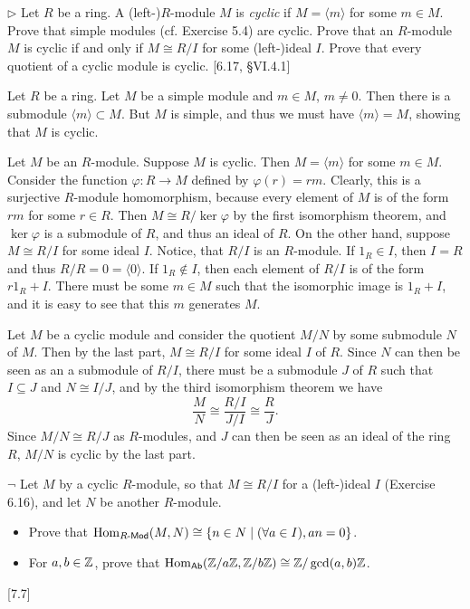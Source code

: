 \begin{problem}
	$\triangleright$ Let $R$ be a ring. A (left-)$R$-module $M$ is \emph{cyclic} if $M = \langle m \rangle$ for some $m \in M$. Prove that simple modules (cf. Exercise 5.4) are cyclic. Prove that an $R$-module $M$ is cyclic if and only if $M \cong R/I$ for some (left-)ideal $I$. Prove that every quotient of a cyclic module is cyclic. [6.17, \S VI.4.1]
\end{problem}

\begin{solution}
	Let $R$ be a ring. Let $M$ be a simple module and $m \in M$, $m \neq 0$. Then there is a submodule $\langle m \rangle \subset M$. But $M$ is simple, and thus we must have $\langle m \rangle = M$, showing that $M$ is cyclic.
	
	Let $M$ be an $R$-module. Suppose $M$ is cyclic. Then $M = \langle m \rangle$ for some $m \in M$. Consider the function $\varphi: R \to M$ defined by $\varphi(r) = rm$. Clearly, this is a surjective $R$-module homomorphism, because every element of $M$ is of the form $rm$ for some $r \in R$. Then $M \cong R/\ker \varphi$ by the first isomorphism theorem, and $\ker \varphi$ is a submodule of $R$, and thus an ideal of $R$. On the other hand, suppose $M \cong R/I$ for some ideal $I$. Notice, that $R/I$ is an $R$-module. If $1_R \in I$, then $I = R$ and thus $R/R = 0 = \langle 0 \rangle$. If $1_R \not \in I$, then each element of $R/I$ is of the form $r 1_R + I$. There must be some $m \in M$ such that the isomorphic image is $1_R + I$, and it is easy to see that this $m$ generates $M$.
	
	Let $M$ be a cyclic module and consider the quotient $M/N$ by some submodule $N$ of $M$. Then by the last part, $M \cong R/I$ for some ideal $I$ of $R$. Since $N$ can then be seen as an a submodule of $R/I$, there must be a submodule $J$ of $R$ such that $I \subseteq J$ and $N \cong I/J$, and by the third isomorphism theorem we have
	\[
		\frac{M}{N} \cong \frac{R/I}{J/I} \cong \frac{R}{J} \text{.}
	\]
	Since $M/N \cong R/J$ as $R$-modules, and $J$ can then be seen as an ideal of the ring $R$, $M/N$ is cyclic by the last part.
\end{solution}

\begin{problem}
	$\neg$ Let $M$ by a cyclic $R$-module, so that $M \cong R/I$ for a (left-)ideal $I$ (Exercise 6.16), and let $N$ be another $R$-module.
	\begin{itemize}
		\item Prove that $\mathrm{Hom}_{R\text{-}\mathsf{Mod}}(M, N) \cong \{ n \in N \mid (\forall a \in I), an = 0 \}$.
		\item For $a, b \in \mathbb{Z}$, prove that $\mathrm{Hom}_{\mathsf{Ab}}(\mathbb{Z}/a\mathbb{Z}, \mathbb{Z}/b\mathbb{Z}) \cong \mathbb{Z}/\gcd(a, b)\mathbb{Z}$.
	\end{itemize}
	[7.7]
\end{problem}

